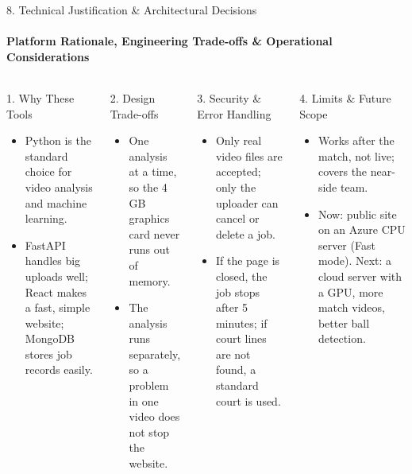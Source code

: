 \documentclass[aspectratio=169, 11pt]{beamer}
\begin{document}
\begin{frame}{8. Technical Justification \& Architectural Decisions}
    \framesubtitle{Platform Rationale, Engineering Trade-offs \& Operational Considerations}
\begin{columns}[T]
\begin{block}{1. Why These Tools}
\scriptsize
\begin{itemize}
  \item Python is the standard choice for video analysis and machine learning.
  \item FastAPI handles big uploads well; React makes a fast, simple website; MongoDB stores job records easily.
\end{itemize}
\end{block}
\begin{block}{2. Design Trade-offs}
\scriptsize
\begin{itemize}
  \item One analysis at a time, so the 4 GB graphics card never runs out of memory.
  \item The analysis runs separately, so a problem in one video does not stop the website.
\end{itemize}
\end{block}
\begin{block}{3. Security \& Error Handling}
\scriptsize
\begin{itemize}
  \item Only real video files are accepted; only the uploader can cancel or delete a job.
  \item If the page is closed, the job stops after 5 minutes; if court lines are not found, a standard court is used.
\end{itemize}
\end{block}
\begin{block}{4. Limits \& Future Scope}
\scriptsize
\begin{itemize}
  \item Works after the match, not live; covers the near-side team.
  \item Now: public site on an Azure CPU server (Fast mode). Next: a cloud server with a GPU, more match videos, better ball detection.
\end{itemize}
\end{block}
\end{columns}
\end{frame}
\end{document}
